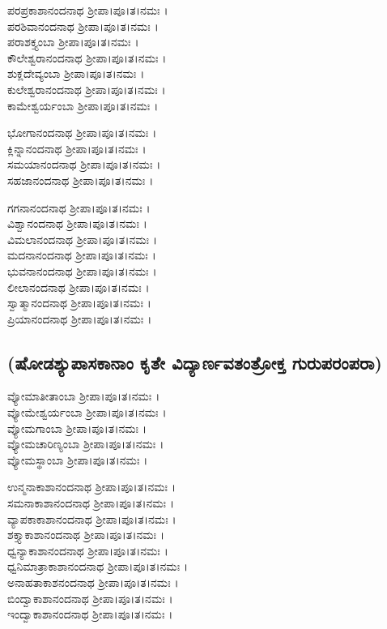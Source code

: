  ಪರಪ್ರಕಾಶಾನಂದನಾಥ ಶ್ರೀಪಾ।ಪೂ।ತ।ನಮಃ ।\\
 ಪರಶಿವಾನಂದನಾಥ ಶ್ರೀಪಾ।ಪೂ।ತ।ನಮಃ ।\\
 ಪರಾಶಕ್ತ್ಯಂಬಾ ಶ್ರೀಪಾ।ಪೂ।ತ।ನಮಃ ।\\
 ಕೌಲೇಶ್ವರಾನಂದನಾಥ ಶ್ರೀಪಾ।ಪೂ।ತ।ನಮಃ ।\\
 ಶುಕ್ಲದೇವ್ಯಂಬಾ ಶ್ರೀಪಾ।ಪೂ।ತ।ನಮಃ ।\\
 ಕುಲೇಶ್ವರಾನಂದನಾಥ ಶ್ರೀಪಾ।ಪೂ।ತ।ನಮಃ ।\\
 ಕಾಮೇಶ್ವರ್ಯಂಬಾ ಶ್ರೀಪಾ।ಪೂ।ತ।ನಮಃ ।

 ಭೋಗಾನಂದನಾಥ ಶ್ರೀಪಾ।ಪೂ।ತ।ನಮಃ ।\\
 ಕ್ಲಿನ್ನಾನಂದನಾಥ ಶ್ರೀಪಾ।ಪೂ।ತ।ನಮಃ ।\\
 ಸಮಯಾನಂದನಾಥ ಶ್ರೀಪಾ।ಪೂ।ತ।ನಮಃ ।\\
 ಸಹಜಾನಂದನಾಥ ಶ್ರೀಪಾ।ಪೂ।ತ।ನಮಃ ।

 ಗಗನಾನಂದನಾಥ ಶ್ರೀಪಾ।ಪೂ।ತ।ನಮಃ ।\\
 ವಿಶ್ವಾನಂದನಾಥ ಶ್ರೀಪಾ।ಪೂ।ತ।ನಮಃ ।\\
 ವಿಮಲಾನಂದನಾಥ ಶ್ರೀಪಾ।ಪೂ।ತ।ನಮಃ ।\\
 ಮದನಾನಂದನಾಥ ಶ್ರೀಪಾ।ಪೂ।ತ।ನಮಃ ।\\
 ಭುವನಾನಂದನಾಥ ಶ್ರೀಪಾ।ಪೂ।ತ।ನಮಃ ।\\
 ಲೀಲಾನಂದನಾಥ ಶ್ರೀಪಾ।ಪೂ।ತ।ನಮಃ ।\\
 ಸ್ವಾತ್ಮಾನಂದನಾಥ ಶ್ರೀಪಾ।ಪೂ।ತ।ನಮಃ ।\\
 ಪ್ರಿಯಾನಂದನಾಥ ಶ್ರೀಪಾ।ಪೂ।ತ।ನಮಃ ।
\subsection{(ಷೋಡಶ್ಯುಪಾಸಕಾನಾಂ ಕೃತೇ ವಿದ್ಯಾರ್ಣವತಂತ್ರೋಕ್ತ ಗುರುಪರಂಪರಾ)}
 ವ್ಯೋಮಾತೀತಾಂಬಾ ಶ್ರೀಪಾ।ಪೂ।ತ।ನಮಃ ।\\
 ವ್ಯೋಮೇಶ್ವರ್ಯಂಬಾ ಶ್ರೀಪಾ।ಪೂ।ತ।ನಮಃ ।\\
 ವ್ಯೋಮಗಾಂಬಾ ಶ್ರೀಪಾ।ಪೂ।ತ।ನಮಃ ।\\
 ವ್ಯೋಮಚಾರಿಣ್ಯಂಬಾ ಶ್ರೀಪಾ।ಪೂ।ತ।ನಮಃ ।\\
 ವ್ಯೋಮಸ್ಥಾಂಬಾ ಶ್ರೀಪಾ।ಪೂ।ತ।ನಮಃ ।

 ಉನ್ಮನಾಕಾಶಾನಂದನಾಥ ಶ್ರೀಪಾ।ಪೂ।ತ।ನಮಃ ।\\
 ಸಮನಾಕಾಶಾನಂದನಾಥ ಶ್ರೀಪಾ।ಪೂ।ತ।ನಮಃ ।\\
 ವ್ಯಾಪಕಾಕಾಶಾನಂದನಾಥ ಶ್ರೀಪಾ।ಪೂ।ತ।ನಮಃ ।\\
 ಶಕ್ತ್ಯಾಕಾಶಾನಂದನಾಥ ಶ್ರೀಪಾ।ಪೂ।ತ।ನಮಃ ।\\
 ಧ್ವನ್ಯಾಕಾಶಾನಂದನಾಥ ಶ್ರೀಪಾ।ಪೂ।ತ।ನಮಃ ।\\
 ಧ್ವನಿಮಾತ್ರಾಕಾಶಾನಂದನಾಥ ಶ್ರೀಪಾ।ಪೂ।ತ।ನಮಃ ।\\
 ಅನಾಹತಾಕಾಶನಂದನಾಥ ಶ್ರೀಪಾ।ಪೂ।ತ।ನಮಃ ।\\
 ಬಿಂದ್ವಾಕಾಶಾನಂದನಾಥ ಶ್ರೀಪಾ।ಪೂ।ತ।ನಮಃ ।\\
 ಇಂದ್ವಾಕಾಶಾನಂದನಾಥ ಶ್ರೀಪಾ।ಪೂ।ತ।ನಮಃ ।

